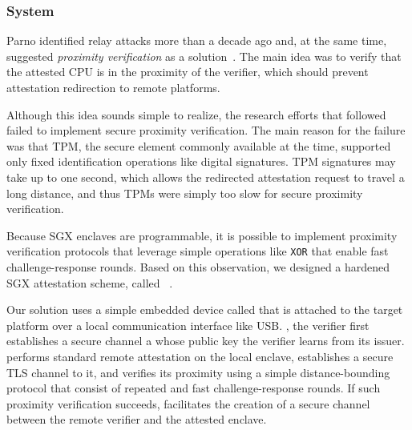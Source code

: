 
\subsubsection*{\proximitee System}

Parno identified relay attacks more than a decade ago and, at the same time, suggested \emph{proximity verification} as a solution~\cite{parno2008bootstrapping}. The main idea was to verify that the attested CPU is in the proximity of the verifier, which should prevent attestation redirection to remote platforms. 

Although this idea sounds simple to realize, the research efforts that followed failed to implement secure proximity verification. The main reason for the failure was that TPM, the secure element commonly available at the time, supported only fixed identification operations like digital signatures. TPM signatures may take up to one second, which allows the redirected attestation request to travel a long distance, and thus TPMs were simply too slow for secure proximity verification. %

Because SGX enclaves are programmable, it is possible to implement proximity verification protocols that leverage simple operations like \texttt{XOR} that enable fast challenge-response rounds. Based on this observation, we designed a hardened SGX attestation scheme, called \proximitee~\cite{proximitee}. %

Our solution uses a simple embedded device called \key that is attached to the target platform over a local communication interface like USB. , the verifier first establishes a secure channel a \key whose public key the verifier learns from its issuer. \key performs standard remote attestation on the local enclave, establishes a secure TLS channel to it, and verifies its proximity using a simple distance-bounding protocol that consist of repeated and fast challenge-response rounds. If such proximity verification succeeds, \key facilitates the creation of a secure channel between the remote verifier and the attested enclave. 


